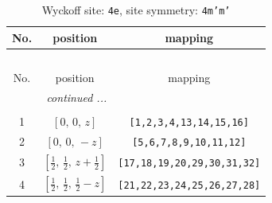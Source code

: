 \documentclass[fleqn,8pt]{jsarticle}
\begin{document}
\renewcommand{\arraystretch}{1.2}
\begin{longtable}{ccc}
\caption{Wyckoff site: {\tt 4e}, site symmetry: {\tt 4m'm'}}
 \\
 \hline \hline
No. & position & mapping \\ \hline \endfirsthead

\multicolumn{2}{l}{\tablename\ \thetable{}} \\
 \hline \hline
No. & position & mapping \\ \hline \endhead

 \hline \hline
\multicolumn{2}{r}{\footnotesize\it continued ...} \\ \endfoot

 \hline \hline
\multicolumn{2}{r}{} \\ \endlastfoot

1 & $\left[ 0,\, 0,\, z \right]$ & {\tt [1,2,3,4,13,14,15,16]} \\ \hline
2 & $\left[ 0,\, 0,\, - z \right]$ & {\tt [5,6,7,8,9,10,11,12]} \\ \hline
3 & $\left[ \frac{1}{2},\, \frac{1}{2},\, z + \frac{1}{2} \right]$ & {\tt [17,18,19,20,29,30,31,32]} \\ \hline
4 & $\left[ \frac{1}{2},\, \frac{1}{2},\, \frac{1}{2} - z \right]$ & {\tt [21,22,23,24,25,26,27,28]} \\
\end{longtable}
\renewcommand{\arraystretch}{1.2}
\end{document}
